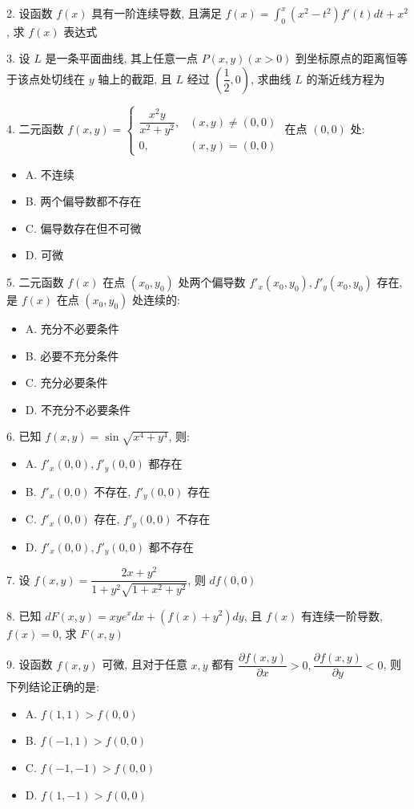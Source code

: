 2. 设函数 $f(x)$ 具有一阶连续导数, 且满足 $f(x)=\int_{0}^{x}(x^{2}-t^{2})f'(t)dt+x^{2}$, 求 $f(x)$ 表达式

3. 设 $L$ 是一条平面曲线, 其上任意一点 $P(x,y)(x>0)$ 到坐标原点的距离恒等于该点处切线在 $y$ 轴上的截距, 且 $L$ 经过 $(\dfrac{1}{2},0)$, 求曲线 $L$ 的渐近线方程为

4. 二元函数 $f(x,y)=
\begin{cases}
	\dfrac{x^{2}y}{x^{2}+y^{2}},&(x,y)\neq (0,0)\\
	0,&(x,y)=(0,0)
\end{cases}$ 在点 $(0,0)$ 处:
\begin{itemize}
	\item A. 不连续
	\item B. 两个偏导数都不存在
	\item C. 偏导数存在但不可微
	\item D. 可微
\end{itemize}

5. 二元函数 $f(x)$ 在点 $(x_{0},y_{0})$ 处两个偏导数 $f'_{x}(x_{0},y_{0}),f'_{y}(x_{0},y_{0})$ 存在, 是 $f(x)$ 在点 $(x_{0},y_{0})$ 处连续的:
\begin{itemize}
	\item A. 充分不必要条件
	\item B. 必要不充分条件
	\item C. 充分必要条件
	\item D. 不充分不必要条件
\end{itemize}

6. 已知 $f(x,y)=\sin\sqrt{x^{4}+y^{4}}$, 则:
\begin{itemize}
	\item A. $f'_{x}(0,0),f'_{y}(0,0)$ 都存在
	\item B. $f'_{x}(0,0)$ 不存在, $f'_{y}(0,0)$ 存在
	\item C. $f'_{x}(0,0)$ 存在, $f'_{y}(0,0)$ 不存在
	\item D. $f'_{x}(0,0),f'_{y}(0,0)$ 都不存在
\end{itemize}

7. 设 $f(x,y)=\dfrac{2x+y^{2}}{1+y^{2}\sqrt{1+x^{2}+y^{2}}}$, 则 $d f(0,0)$

8. 已知 $dF(x,y)=xye^{x}dx+(f(x)+y^{2})dy$, 且 $f(x)$ 有连续一阶导数, $f(x)=0$, 求 $F(x,y)$

9. 设函数 $f(x,y)$ 可微, 且对于任意 $x,y$ 都有 $\dfrac{\partial f(x,y)}{\partial x}>0,\dfrac{\partial f(x,y)}{\partial y}<0$, 则下列结论正确的是:
\begin{itemize}
	\item A. $f(1,1)>f(0,0)$
	\item B. $f(-1,1)>f(0,0)$
	\item C. $f(-1,-1)>f(0,0)$
	\item D. $f(1,-1)>f(0,0)$
\end{itemize}

